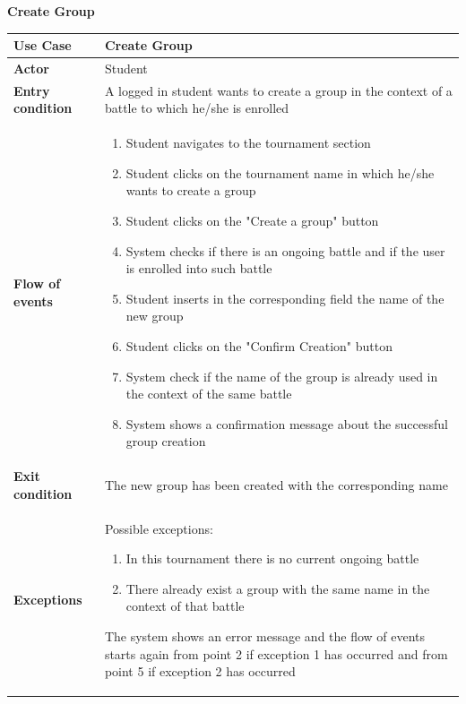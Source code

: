 \documentclass[../RASD.tex]{subfiles}
\begin{document}
        \textbf{Create Group}
        \begin{table}[h!]
            \begin{center}
                \begin{tabular}{|m{10em}|m{30em}|}
                \hline
                \textbf{Use Case} & Create Group\\
                \hline
                \textbf{Actor} & Student\\
                \hline
                \textbf{Entry condition} & A logged in student wants to create a group in the context of a battle to which he/she is enrolled\\
                \hline
                \textbf{Flow of events} & 
                    \begin{enumerate}
                        \item Student navigates to the tournament section
                        \item Student clicks on the tournament name in which he/she wants to create a group
                        \item Student clicks on the "Create a group" button
                        \item System checks if there is an ongoing battle and if the user is enrolled into such battle
                        \item Student inserts in the corresponding field the name of the new group
                        \item Student clicks on the "Confirm Creation" button
                        \item System check if the name of the group is already used in the context of the same battle
                        \item System shows a confirmation message about the successful group creation
                    \end{enumerate}\\
                \hline
                \textbf{Exit condition} & The new group has been created with the corresponding name\\
                \hline
                \textbf{Exceptions} & 
                    Possible exceptions:
                    \begin{enumerate}
                        \item In this tournament there is no current ongoing battle
                        \item There already exist a group with the same name in the context of that battle
                    \end{enumerate}
                    The system shows an error message and the flow of events starts again from point 2 if exception 1 has occurred and from point 5 if exception 2 has occurred\\
                \hline
                \end{tabular}
            \end{center}
        \end{table}\newpage
        \restoregeometry
\end{document}
